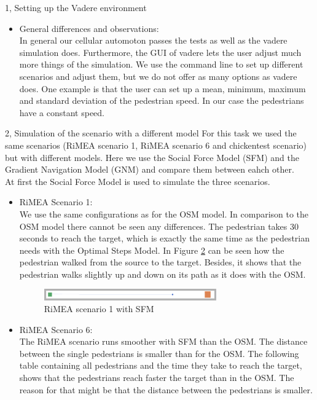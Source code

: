 \documentclass[10pt,a4paper]{article}
\begin{document}
\begin{task}{1, Setting up the Vadere environment}
\begin{itemize}
\begin{figure}[H]
        \caption{Chickentest with OSM}
        \label{fig:chickentest_osm}
    \end{figure}
    \item General differences and observations: \\
    In general our cellular automoton passes the tests as well as the vadere simulation does. Furthermore, the GUI of vadere lets the user adjust much more things of the simulation. We use the command line to set up different scenarios and adjust them, but we do not offer as many options as vadere does. One example is that the user can set up a mean, minimum, maximum and standard deviation of the pedestrian speed. In our case the pedestrians have a constant speed.
\end{itemize}
\end{task}
\begin{task}{2, Simulation of the scenario with a different model}
For this task we used the same scenarios (RiMEA scenario 1, RiMEA scenario 6 and chickentest scenario) but with different models. Here we use the Social Force Model (SFM) and the Gradient Navigation Model (GNM) and compare them between eahch other.\\
At first the Social Force Model is used to simulate the three scenarios.
\begin{itemize}
    \item RiMEA Scenario 1:\\
    We use the same configurations as for the OSM model. In comparison to the OSM model there cannot be seen any differences. The pedestrian takes 30 seconds to reach the target, which is exactly the same time as the pedestrian needs with the Optimal Steps Model. In Figure \ref{fig:rimea1_sfm} can be seen how the pedestrian walked from the source to the target. Besides, it shows that the pedestrian walks slightly up and down on its path as it does with the OSM.
    \begin{figure}[H]
        \centering
        \includegraphics[width=0.7\textwidth]{pictures/sfm/rimeatest1.png}
        \caption{RiMEA scenario 1 with SFM}
        \label{fig:rimea1_sfm}
    \end{figure}
    \item RiMEA Scenario 6:\\
    The RiMEA scenario runs smoother with SFM than the OSM. The distance between the single pedestrians is smaller than for the OSM. The following table containing all pedestrians and the time they take to reach the target, shows that the pedestrians reach faster the target than in the OSM. The reason for that might be that the distance between the pedestrians is smaller.

\end{itemize}
\end{task}
\end{document}
